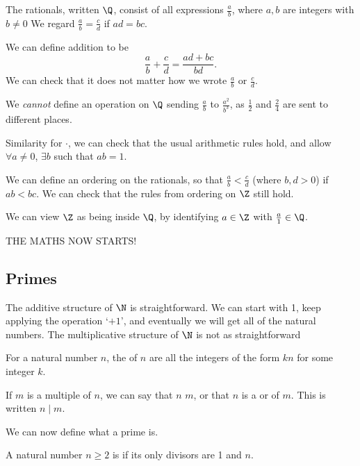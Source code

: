 \documentclass[a4]{scrartcl}
\begin{document}
The rationals, written $\Q$, consist of all expressions $\frac{a}{b}$, where $a, b$ are integers with $b \neq 0$ We regard $\frac{a}{b} = \frac{c}{d}$ if $ad = bc$.

We can define addition to be
$$
\frac{a}{b} + \frac{c}{d} = \frac{ad + bc}{bd}.
$$
We can check that it does not matter how we wrote $\frac{a}{b}$ or $\frac{c}{d}$.

\begin{example}
	We \emph{cannot} define an operation on $\Q$ sending $\frac{a}{b}$ to $\frac{a^2}{b^3}$, as $\frac{1}{2}$ and $\frac{2}{4}$ are sent to different places.
\end{example}

Similarity for $\cdot$, we can check that the usual arithmetic rules hold, and allow $\forall a \neq 0$, $\exists b$ such that $ab = 1$.

We can define an ordering on the rationals, so that $\frac{a}{b} < \frac{c}{d}$ (where $b, d > 0$) if $ab < bc$. We can check that the rules from ordering on $\Z$ still hold.

\begin{remark}
	We can view $\Z$ as being inside $\Q$, by identifying $a \in \Z$ with $\frac{a}{1} \in \Q$.
\end{remark}

THE MATHS NOW STARTS!

\subsection{Primes}

The additive structure of $\N$ is straightforward. We can start with 1, keep applying the operation `$+1$', and eventually we will get all of the natural numbers.
The multiplicative structure of $\N$ is not as straightforward

\begin{definition}
	For a natural number $n$, the  of $n$ are all the integers of the form $kn$ for some integer $k$.

	If $m$ is a multiple of $n$, we can say that $n$  $m$, or that $n$ is a  or  of $m$. This is written $n \mid m$.
\end{definition}

We can now define what a prime is.

\begin{definition}[Primes]
	A natural number $n \geq 2$ is  if its only divisors are 1 and $n$.
\end{definition}
\end{document}
